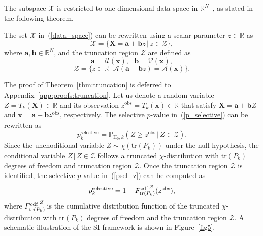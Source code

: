 %
The subspace $\mathcal{X}$ is restricted to one-dimensional data space in $\mathbb{R}^N$~\citep{lee2016exact, liu2018more}, as stated in the following theorem.
\begin{theorem}
  \label{thm:truncation}
  The set $\mathcal{X}$ in~(\ref{data_space}) can be rewritten using a scalar parameter $z \in \mathbb{R}$ as
  \begin{equation}
    \mathcal{X} = \{\bm{X} = \bm{a} + \bm{b} z \, | \, z \in \mathcal{Z}\}, \label{one-D}
  \end{equation}
  where $\bm{a}, \bm{b} \in \mathbb{R}^N$, and the truncation region $\mathcal{Z}$ are defined as
  \begin{equation}
    \bm{a} =\mathcal{U}(\bm{x}), ~~~ \bm{b} = \mathcal{V}(\bm{x}), \label{ab}
  \end{equation}
  \begin{equation}
    \mathcal{Z} = \{z \in \mathbb{R} \, | \, \mathcal{A}( \bm{a} + \bm{b} z) = \mathcal{A}(\bm{x})\}. \label{truncatedarea}
  \end{equation}
\end{theorem}

The proof of Theorem~\ref{thm:truncation} is deferred to Appendix~\ref{app:proofs:truncation}. 
%
Let us denote a random variable $Z = T_k(\bm{X}) \in \mathbb{R}$ and its observation $z^{\text{obs}} = T_k(\bm{x}) \in \mathbb{R}$ that satisfy $\bm{X} = \bm{a} + \bm{b} Z$ and $\bm{x} = \bm{a} + \bm{b} z^{\text{obs}}$, respectively.
%
The selective $p$-value in~(\ref{p_selective}) can be rewritten as
\begin{equation}
  p_k^{\text{selective}} = \mathbb{P}_{\text{H}_0,k} (Z \geq z^{\text{obs}} \, | \, Z \in \mathcal{Z}). \label{psel_z}
\end{equation} 
%
Since the uncnoditional variable $Z \sim \chi(\mathrm{tr}(P_k))$ under the null hypothesis, the conditional variable $Z \, | \, Z \in \mathcal{Z}$ follows a truncated $\chi$-distribution with $\mathrm{tr}(P_k)$ degrees of freedom and truncation region $\mathcal{Z}$.
%
Once the truncation region $\mathcal{Z}$ is identified, the selective $p$-value in~(\ref{psel_z}) can be computed as
\begin{equation}
  p_k^{\text{selective}} = 1 - {F_{\text{tr}\left(P_{k}\right)}^{\text{cdf}}}^{\hspace{-3mm} \mathcal{Z}} \, (z^{\text{obs}}), \notag %
\end{equation}
where ${F_{\text{tr}(P_{k})}^{\text{cdf}}}^{\hspace{-3mm} \mathcal{Z}}$ is the cumulative distribution function of the truncated $\chi$-distribution with $\mathrm{tr}(P_k)$ degrees of freedom and the truncation region $\mathcal{Z}$.
%
A schematic illustration of the SI framework is shown in Figure~\ref{fig5}.

